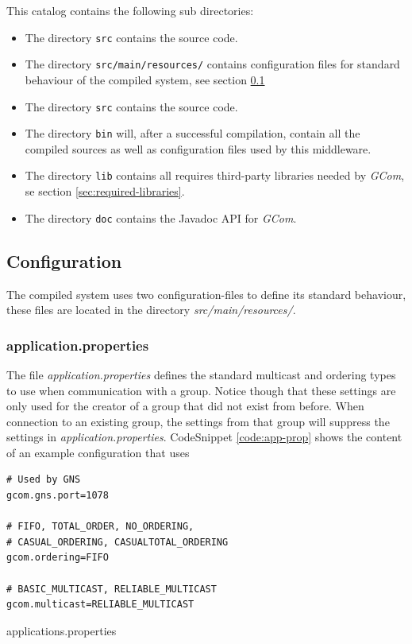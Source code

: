 \documentclass[titlepage, twocolumn, a4paper, 10pt]{article}
\begin{document}
This catalog contains the following sub directories:
\begin{itemize}
\item The directory \verb!src! contains the source code.
\item The directory \verb!src/main/resources/! contains configuration
  files for standard behaviour of the compiled system, see section
  \ref{sec:configuration}
\item The directory \verb!src! contains the source code.
\item The directory \verb!bin! will, after a successful compilation,
  contain all the compiled sources as well as configuration files used
  by this middleware.
\item The directory \verb!lib! contains all requires third-party libraries
  needed by \textit{GCom}, se section \ref{sec:required-libraries}.
\item The directory \verb!doc! contains the Javadoc API for \textit{GCom}.
\end{itemize}

\subsection{Configuration}\label{sec:configuration}
The compiled system uses two configuration-files to define its
standard behaviour, these files are located in the directory
\textit{src/main/resources/}.

\subsubsection{application.properties}\label{sec:application.properties}
The file \textit{application.properties} defines the standard
multicast and ordering types to use when communication with a group.
Notice though that these settings are only used for the creator of a
group that did not exist from before. When connection to an existing
group, the settings from that group will suppress the settings in
\textit{application.properties}. CodeSnippet \ref{code:app-prop}
shows the content of an example configuration that uses

\begin{code}
  \begin{footnotesize}
\begin{verbatim}
# Used by GNS
gcom.gns.port=1078

# FIFO, TOTAL_ORDER, NO_ORDERING,
# CASUAL_ORDERING, CASUALTOTAL_ORDERING
gcom.ordering=FIFO

# BASIC_MULTICAST, RELIABLE_MULTICAST
gcom.multicast=RELIABLE_MULTICAST
\end{verbatim}
  \end{footnotesize}
  \caption{applications.properties}\label{code:app-prop}
\end{code}
\end{document}
